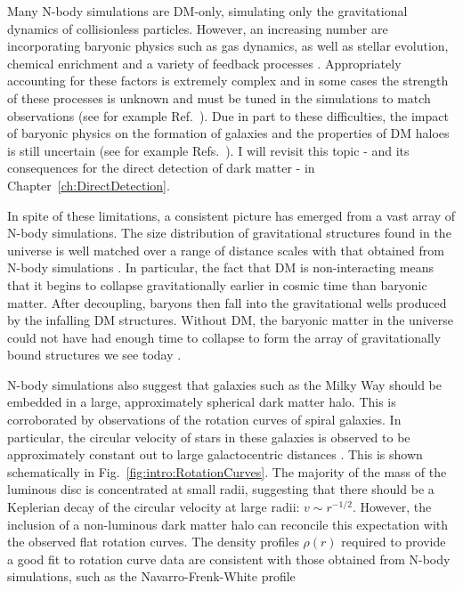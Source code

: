 Many N-body simulations are DM-only, simulating only the gravitational dynamics of collisionless particles. However, an increasing number are incorporating baryonic physics such as gas dynamics, as well as stellar evolution, chemical enrichment and a variety of feedback processes . Appropriately accounting for these factors is extremely complex and in some cases the strength of these processes is unknown and must be tuned in the simulations to match observations (see for example Ref.~\cite{Vogelsberger:2013}).  Due in part to these difficulties, the impact of baryonic physics on the formation of galaxies and the properties of DM haloes is still uncertain (see for example Refs.~\cite{Martizzi:2012,Pillepich:2014}). I will revisit this topic - and its consequences for the direct detection of dark matter - in Chapter~\ref{ch:DirectDetection}.

In spite of these limitations, a consistent picture has emerged from a vast array of N-body simulations. The size distribution of gravitational structures found in the universe is well matched over a range of distance scales  with that obtained from N-body simulations . In particular, the fact that DM is non-interacting means that it begins to collapse gravitationally earlier in cosmic time than baryonic matter. After decoupling, baryons then fall into the gravitational wells produced by the infalling DM structures. Without DM, the baryonic matter in the universe could not have had enough time to collapse to form the array of gravitationally bound structures we see today \cite{Kolb:1990}. 

N-body simulations also suggest that galaxies such as the Milky Way should be embedded in a large, approximately spherical dark matter halo. This is corroborated by observations of the rotation curves of spiral  galaxies. In particular, the circular velocity of stars in these galaxies is observed to be approximately constant out to large galactocentric distances \cite{Begeman:1991,Persic:1996}. This is shown schematically in Fig.~\ref{fig:intro:RotationCurves}.  The majority of the mass of the luminous disc is concentrated at small radii, suggesting that there should be a Keplerian decay of the circular velocity at large radii: $v \sim r^{-1/2}$. However, the inclusion of a non-luminous dark matter halo can reconcile this expectation with the observed flat rotation curves. The density profiles $\rho(r)$ required to provide a good fit to rotation curve data are consistent with those obtained from N-body simulations, such as the Navarro-Frenk-White profile 

